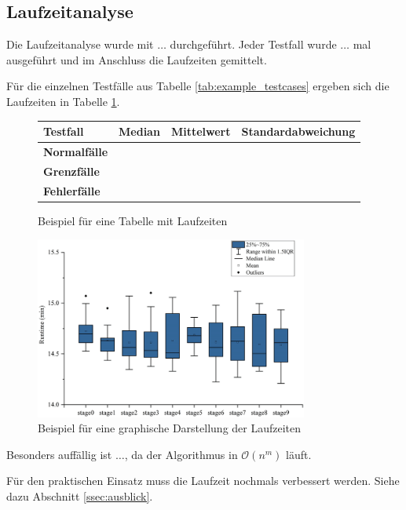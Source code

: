 \subsection{Laufzeitanalyse}
\label{ssec:laufzeitanalyse}

Die Laufzeitanalyse wurde mit $\ldots$ durchgeführt.
Jeder Testfall wurde $\ldots$ mal ausgeführt und im Anschluss die Laufzeiten gemittelt.

Für die einzelnen Testfälle aus Tabelle \ref{tab:example_testcases} ergeben sich die Laufzeiten in Tabelle \ref{tab:example_runtime}.

\begin{figure}[H]
    \centering
    \begin{tabular}{|l|l|l|l|}
        \hline
        \textbf{Testfall}    & \textbf{Median} & \textbf{Mittelwert} & \textbf{Standardabweichung} \\
        \hline
        \hline
        \textbf{Normalfälle} &                 &                     &                             \\
        \hline
        \hline
        \textbf{Grenzfälle}  &                 &                     &                             \\
        \hline
        \hline
        \textbf{Fehlerfälle} &                 &                     &                             \\
        \hline
    \end{tabular}
    \caption{Beispiel für eine Tabelle mit Laufzeiten}
    \label{tab:example_runtime}
\end{figure}

\begin{figure}[H]
    \centering
    \includegraphics[width=0.8\textwidth]{figures/example_runtime.png}
    \caption{Beispiel für eine graphische Darstellung der Laufzeiten}
    \label{fig:example_runtime}
\end{figure}

Besonders auffällig ist $\ldots$, da der Algorithmus in $\mathcal{O}(n^m)$ läuft.

Für den praktischen Einsatz muss die Laufzeit nochmals verbessert werden.
Siehe dazu Abschnitt \ref{ssec:ausblick}.